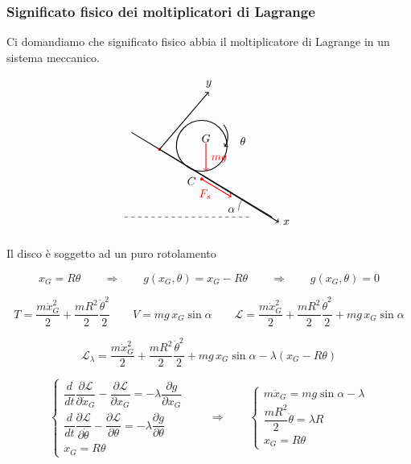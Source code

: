 \subsubsection{Significato fisico dei moltiplicatori di Lagrange}
Ci domandiamo che significato fisico abbia il moltiplicatore di Lagrange in un sistema meccanico.
\begin{example}{}
\[
\begin{tikzpicture}[scale=1.1]
  \draw[thick] (-2,1.2) -- (2,-1.2);
  \draw[dashed] (-2.2,-1.2) -- (1.4,-1.2);

  \fill[red] (-1.2,0.72) circle (1.2pt);
  \draw[->,thick] (-1.2,0.72) -- (0.2,2.35) node[above] {$y$};
  \draw[->,thick] (-1.2,0.72) -- (2.2,-1.35) node[right] {$x$};

  \draw[thick] (0,0.82) circle (0.72);
  \node at (0.12,1.03) {$G$};

  \fill[red] (0,-0.12) circle (1.2pt);
  \node[left] at (-0.05,-0.18) {$C$};

  \draw[->,red,thick] (0.12,0.9) -- (0.12,0.1);
  \node[red,right] at (0.16,0.45) {$mg$};

  \draw[->,red,thick] (0,-0.12) -- (0.85,-0.63);
  \node[red] at (0.1,-0.55) {$F_s$};

  \draw (1.05,-1.02) arc[start angle=180,end angle=142,radius=0.55];
  \node at (0.85,-1.0) {$\alpha$};

  \draw[->,thick] (0.62,1.42) arc[start angle=40,end angle=-35,radius=0.52];
  \node[right] at (0.98,0.95) {$\theta$};
\end{tikzpicture}
\]

Il disco è soggetto ad un puro rotolamento

\[
x_G=R\theta
\qquad
\Rightarrow
\qquad
g(x_G,\theta)=x_G-R\theta
\qquad
\Rightarrow
\qquad
g(x_G,\theta)=0
\]

\[
T=\frac{m\dot{x}_G^2}{2}+\frac{mR^2}{2}\frac{\dot{\theta}^2}{2}
\qquad
V=mg\,x_G\sin\alpha
\qquad
\mathcal{L}=\frac{m\dot{x}_G^2}{2}+\frac{mR^2}{2}\frac{\dot{\theta}^2}{2}+mg\,x_G\sin\alpha
\]

\[
\mathcal{L}_\lambda=
\frac{m\dot{x}_G^2}{2}
+
\frac{mR^2}{2}\frac{\dot{\theta}^2}{2}
+
mg\,x_G\sin\alpha
-
\lambda(x_G-R\theta)
\]

\[
\begin{cases}
\dfrac{d}{dt}\dfrac{\partial\mathcal{L}}{\partial \dot{x}_G}-\dfrac{\partial\mathcal{L}}{\partial x_G}
=
-\lambda\dfrac{\partial g}{\partial x_G}
\\[1em]
\dfrac{d}{dt}\dfrac{\partial\mathcal{L}}{\partial \dot{\theta}}-\dfrac{\partial\mathcal{L}}{\partial \theta}
=
-\lambda\dfrac{\partial g}{\partial \theta}
\\[1em]
x_G=R\theta
\end{cases}
\qquad
\Rightarrow
\qquad
\begin{cases}
m\ddot{x}_G=mg\sin\alpha-\lambda
\\[0.6em]
\dfrac{mR^2}{2}\ddot{\theta}=\lambda R
\\[0.6em]
x_G=R\theta
\end{cases}
\]


\end{example}
